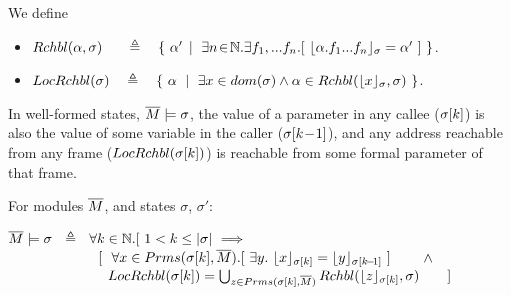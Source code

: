 \begin{definition} We define 
\begin{itemize}
\item
{{$\Relevant {\alpha} {\sigma}  \ \ \ \ \ \triangleq \ \  \  \{ \ \alpha' \, \mid \ \exists n\!\in\!\mathbb{N}.\exists f_1,...f_n. [\ \interpret {\sigma} {\alpha.f_1...f_n} = \alpha'\ ] \ \}$}}.
\item
$ \LRelevantO   \sigma  \ \  \ \triangleq \ \  \  \{ \ \alpha \ \mid \ { \exists x\in dom(\sigma) \wedge \alpha \in \Relevant {\interpret  {\sigma} x}
{\sigma} \ \} } $.
\end{itemize}
\end{definition}


 
In well-formed states, $\overline{M} \models \sigma$,    the value of a parameter in  any callee   (${\sigma[k]}$) is also the %
 value of some variable in the caller (${\sigma[k\!-\!1]}$),
and any address reachable from any frame (${LocRchbl(\sigma[k]) }$) is reachable from some formal parameter of that frame. 
 


\begin{definition}
\label{def:wf:state}
 For modules $\overline{M}$, and  states $\sigma$, $\sigma'$:

$\Mtwo \models \sigma \ \ \triangleq \ \  \forall k\in \mathbb{N}. [ \  1<k\leq \DepthFs {\sigma} \ \Longrightarrow $\\
$\strut \hspace{2.25cm}[\ \ \forall   x \in   \Formals {\RestictTo  \sigma {k}} {\Mtwo}.[\ \exists y. \ \interpret {\RestictTo  \sigma {k}}  {x} = \interpret {\RestictTo  \sigma {k\!-\!1}}  {y} \ ]$ $\hspace{0.3cm} \ \ \  \wedge$  
\\
$\strut \hspace{2.5cm}  {\LRelevantO   {\RestictTo  \sigma {k}} } = \bigcup_{z \in {\Formals {\RestictTo  {\sigma} {k}} {\Mtwo}}}  
{\Relevant { \interpret   {\RestictTo  \sigma {k}}  {z}}\sigma }  \  \ \ \ \ \ ] $
\end{definition}
 
